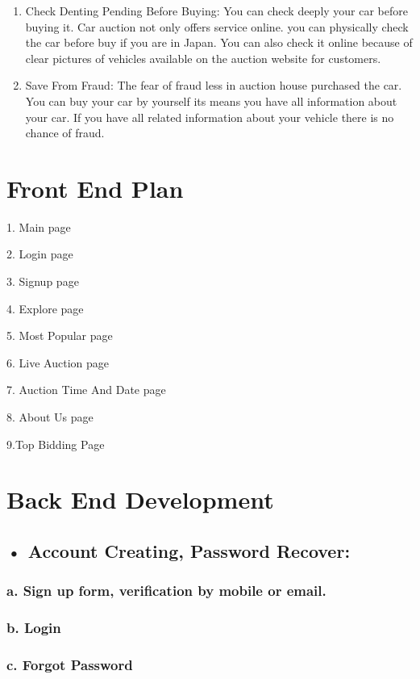 \documentclass{report}
\begin{document}
\begin{enumerate}
\item Check Denting Pending Before Buying:  You can check deeply your car before buying it. Car auction not only offers service online. you can physically check the car before buy if you are in Japan. You can also check it online because of clear pictures of vehicles available on the auction website for customers.
\item Save From Fraud: The fear of fraud less in auction house purchased the car. You can buy your car by yourself its means you have all information about your car. If you have all related information about your vehicle there is no chance of fraud.

\end{enumerate}

\section*{Front End Plan}


1. Main page

2. Login page

3. Signup page

4. Explore page

5. Most Popular page

6. Live Auction page

7. Auction Time And Date page

8. About Us page

9.Top Bidding Page


\section*{Back End Development}

\subsection*{• Account Creating, Password Recover:} 

\subsubsection*{a. Sign up form, verification by mobile or email.}

\subsubsection*{b. Login}

\subsubsection*{c. Forgot Password}
\end{document}
